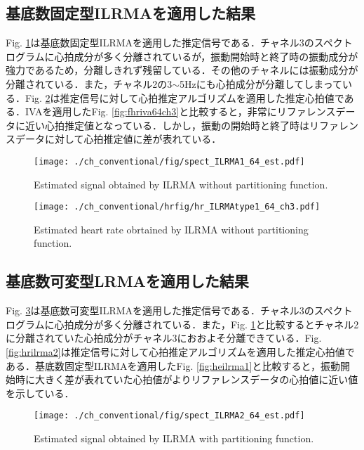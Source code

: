 \subsection{基底数固定型ILRMAを適用した結果}
\label{sec:conv:resultilrma1}
Fig. \ref{fig:silrma1}は基底数固定型ILRMAを適用した推定信号である．チャネル3のスペクトログラムに心拍成分が多く分離されているが，振動開始時と終了時の振動成分が強力であるため，分離しきれず残留している．その他のチャネルには振動成分が分離されている．また，チャネル2の3$\sim$5Hzにも心拍成分が分離してしまっている．Fig. \ref{fig:hrilrma1}は推定信号に対して心拍推定アルゴリズムを適用した推定心拍値である．IVAを適用したFig. \ref{fig:fhriva64ch3}と比較すると，非常にリファレンスデータに近い心拍推定値となっている．しかし，振動の開始時と終了時はリファレンスデータに対して心拍推定値に差が表れている．

\begin{figure}[tb]
\centering
\texttt{[image: ./ch\_conventional/fig/spect\_ILRMA1\_64\_est.pdf]}
\caption{Estimated signal obtained by ILRMA without partitioning function.}
\label{fig:silrma1}
\end{figure}

\begin{figure}[tb]
\centering
\texttt{[image: ./ch\_conventional/hrfig/hr\_ILRMAtype1\_64\_ch3.pdf]}
\caption{Estimated heart rate obrtained by ILRMA without partitioning function.}
\label{fig:hrilrma1}
\end{figure}

\subsection{基底数可変型LRMAを適用した結果}
\label{sec:conv:resultilrma2}
Fig. \ref{fig:silrma2}は基底数可変型ILRMAを適用した推定信号である．チャネル3のスペクトログラムに心拍成分が多く分離されている．また，Fig. \ref{fig:silrma1}と比較するとチャネル2に分離されていた心拍成分がチャネル3におおよそ分離できている．Fig. \ref{fig:hrilrma2}は推定信号に対して心拍推定アルゴリズムを適用した推定心拍値である．基底数固定型ILRMAを適用したFig. \ref{fig:heilrma1}と比較すると，振動開始時に大きく差が表れていた心拍値がよりリファレンスデータの心拍値に近い値を示している．

\begin{figure}[tb]
\centering
\texttt{[image: ./ch\_conventional/fig/spect\_ILRMA2\_64\_est.pdf]}
\caption{Estimated signal obtained by ILRMA with partitioning function.}
\label{fig:silrma2}
\end{figure}

